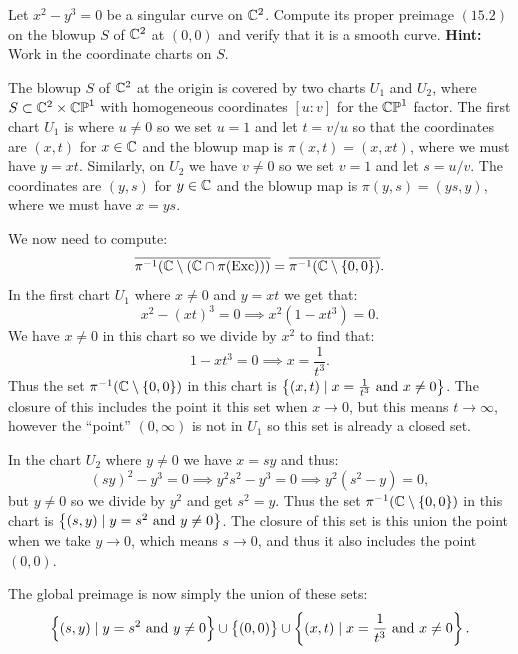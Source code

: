 \documentclass[11pt, a4paper]{article}
\begin{document}
\begin{exercise}
  Let $x^2 - y^3 = 0$ be a singular curve on $\mathbb{C}^2$.
  Compute its proper preimage $(15.2)$ on the blowup $S$ of $\mathbb{C}^2$ at $(0,0)$
  and verify that it is a smooth curve.
  \textbf{Hint:} Work in the coordinate charts on $S$.
\end{exercise}
\begin{solution}
  The blowup $S$ of $\mathbb{C}^2$ at the origin is covered by two charts $U_1$
  and $U_2$, where $S \subset \mathbb{C}^2 \times \mathbb{CP}^1$ with homogeneous coordinates
  $[u : v]$ for the $\mathbb{CP}^1$ factor.
  The first chart $U_1$ is where $u \neq 0$
  so we set $u = 1$ and let $t = v/u$ so that the coordinates are $(x,t)$
  for $x \in \mathbb{C}$ and the blowup map is $\pi(x,t) = (x,xt)$,
  where we must have $y = xt$.
  Similarly, on $U_2$ we have $v \neq 0$ so we set $v = 1$ and let $s = u/v$.
  The coordinates are $(y,s)$ for $y \in \mathbb{C}$ and the blowup map is $\pi(y,s) = (ys,y)$,
  where we must have $x = ys$.

  We now need to compute:
  \[
    \overline{\pi^{-1}(\mathbb{C} \setminus (\mathbb{C} \cap \pi(\mathrm{Exc})))} =
    \overline{\pi^{-1}(\mathbb{C} \setminus \left\{0,0\right\})}.
  \]
  In the first chart $U_1$ where $x \neq 0$ and $y = xt$
  we get that:
  \[
    x^2 - (xt)^3 = 0 \implies
    x^2 (1 - xt^3) = 0.
  \]
  We have $x \neq 0$ in this chart so we divide by $x^2$
  to find that:
  \[
    1 - xt^3 = 0 \implies
    x = \frac{1}{t^3}.
  \]
  Thus the set $\pi^{-1}(\mathbb{C} \setminus \left\{0,0\right\})$ in this chart is
  $\left\{(x,t) \mid x = \frac{1}{t^3} \text{ and } x \neq 0\right\}$.
  The closure of this includes the point it this set when $x \to 0$,
  but this means $t \to \infty$, however the ``point'' $(0,\infty)$
  is not in $U_1$ so this set is already a closed set.
  
  In the chart $U_2$ where $y \neq 0$ we have $x = sy$ and thus:
  \[
    (sy)^2 - y^3 = 0 \implies
    y^2 s^2 - y^3 = 0 \implies
    y^2 (s^2 - y) = 0,
  \]
  but $y \neq 0$ so we divide by $y^2$ and get $s^2 = y$.
  Thus the set $\pi^{-1}(\mathbb{C} \setminus \left\{0,0\right\})$ in this chart is
  $\left\{(s,y) \mid y = s^2 \text{ and } y \neq 0\right\}$.
  The closure of this set is this union the point when we take $y \to 0$,
  which means $s \to 0$, and thus it also includes the point $(0,0)$.

  The global preimage is now simply the union of these sets:
  \[
    \left\{(s,y) \mid y = s^2 \text{ and } y \neq 0\right\} \cup \left\{(0,0)\right\} \cup
    \left\{(x,t) \mid x = \frac{1}{t^3} \text{ and } x \neq 0\right\}.
  \]


\end{solution}
\end{document}
